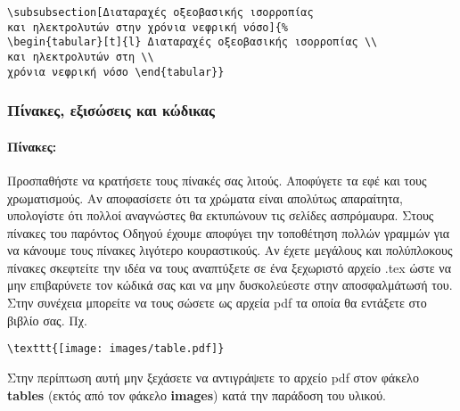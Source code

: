 \begin{refsection}
\begin{enumerate}
\begin{verbatim}
\subsubsection[Διαταραχές οξεοβασικής ισορροπίας 
και ηλεκτρολυτών στην χρόνια νεφρική νόσο]{%
\begin{tabular}[t]{l} Διαταραχές οξεοβασικής ισορροπίας \\ 
και ηλεκτρολυτών στη \\ 
χρόνια νεφρική νόσο \end{tabular}} 
\end{verbatim}
\end{enumerate}
\subsubsection{Πίνακες, εξισώσεις και κώδικας}\label{subsub:tables}
\paragraph{Πίνακες:}
Προσπαθήστε να κρατήσετε τους πίνακές σας λιτούς. Αποφύγετε τα εφέ και τους χρωματισμούς. Αν αποφασίσετε
ότι τα χρώματα είναι απολύτως απαραίτητα, υπολογίστε ότι πολλοί αναγνώστες θα εκτυπώνουν τις σελίδες
ασπρόμαυρα. Στους πίνακες του παρόντος Οδηγού έχουμε αποφύγει την τοποθέτηση πολλών γραμμών για να
κάνουμε τους πίνακες λιγότερο κουραστικούς. Αν έχετε μεγάλους και πολύπλοκους πίνακες σκεφτείτε την ιδέα να
τους αναπτύξετε σε ένα ξεχωριστό αρχείο .tex ώστε να μην επιβαρύνετε τον κώδικά σας και να μην δυσκολεύεστε
στην αποσφαλμάτωσή του. Στην συνέχεια μπορείτε να τους σώσετε ως αρχεία pdf τα οποία θα εντάξετε
στο βιβλίο σας. Πχ.
\begin{verbatim}
\texttt{[image: images/table.pdf]}
\end{verbatim}
Στην περίπτωση αυτή μην ξεχάσετε να αντιγράψετε το αρχείο pdf στον φάκελο \textbf{tables} (εκτός από τον φάκελο \textbf{images}) κατά την παράδοση του υλικού.

\end{refsection}
